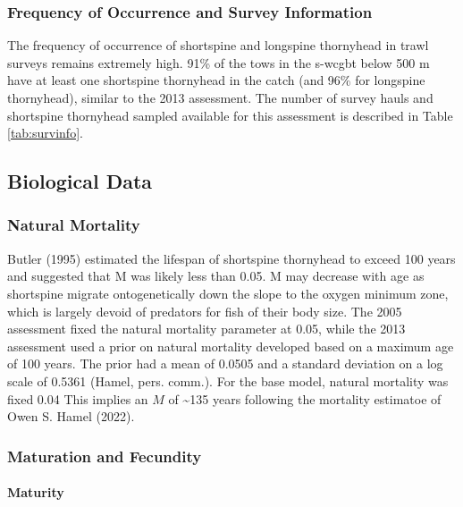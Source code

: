 \documentclass[11pt,
  english,
  letterpaper,
]{article}
\begin{document}
\hypertarget{frequency-of-occurrence-and-survey-information}{%
\subsubsection{Frequency of Occurrence and Survey Information}\label{frequency-of-occurrence-and-survey-information}}

The frequency of occurrence of shortspine and longspine thornyhead in trawl surveys remains extremely high. 91\% of the tows in the \gls{s-wcgbt} below 500 m have at least one shortspine thornyhead in the catch (and 96\% for longspine thornyhead), similar to the 2013 assessment. The number of survey hauls and shortspine thornyhead sampled available for this assessment is described in Table \ref{tab:survinfo}.

\hypertarget{biological-data}{%
\subsection{Biological Data}\label{biological-data}}

\hypertarget{natural-mortality}{%
\subsubsection{Natural Mortality}\label{natural-mortality}}

Butler (1995) estimated the lifespan of shortspine thornyhead to exceed 100 years and suggested that M was likely less than 0.05. M may decrease with age as shortspine migrate ontogenetically down the slope to the oxygen minimum zone, which is largely devoid of predators for fish of their body size. The 2005 assessment fixed the natural mortality parameter at 0.05, while the 2013 assessment used a prior on natural mortality developed based on a maximum age of 100 years. The prior had a mean of 0.0505 and a standard deviation on a log scale of 0.5361 (Hamel, pers. comm.). For the base model, natural mortality was fixed 0.04 This implies an \(M\) of \textasciitilde135 years following the mortality estimatoe of Owen S. Hamel (2022).

\hypertarget{maturation-and-fecundity}{%
\subsubsection{Maturation and Fecundity}\label{maturation-and-fecundity}}

\hypertarget{maturity}{%
\paragraph{Maturity}\label{maturity}}
\end{document}
